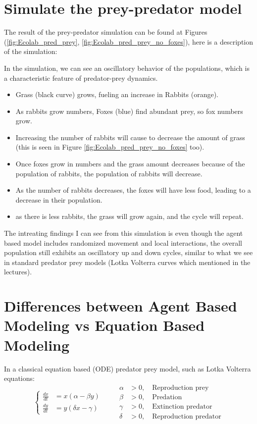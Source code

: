 \section{Simulate the prey-predator model}

The result of the prey-predator simulation can be found at Figures (\ref{fig:Ecolab_pred_prey}, \ref{fig:Ecolab_pred_prey_no_foxes}), here is a description of the simulation:

In the simulation, we can see an oscillatory behavior of the populations, which is a characteristic feature of predator-prey dynamics.
\begin{itemize}
    \item Grass (black curve) grows, fueling an increase in Rabbits (orange).
    \item As rabbits grow numbers, Foxes (blue) find abundant prey, so fox numbers grow.
    \item Increasing the number of rabbits will cause to decrease the amount of grass (this is seen in Figure \ref{fig:Ecolab_pred_prey_no_foxes} too).
    \item Once foxes grow in numbers and the grass amount decreases because of the population of rabbits, the population of rabbits will decrease.
    \item As the number of rabbits decreases, the foxes will have less food, leading to a decrease in their population.
    \item as there is less rabbits, the grass will grow again, and the cycle will repeat.
\end{itemize}

The intreating findings I can see from this simulation is even though the agent based model includes randomized movement and local interactions, the overall population still exhibits an oscillatory up and down cycles, similar to what we see in standard predator prey models (Lotka Volterra curves which mentioned in the lectures).


\section{Differences between Agent Based Modeling vs Equation Based Modeling}

In a classical equation based (ODE) predator prey model, such as Lotka Volterra equations:
\[
\left\{
\begin{aligned}
\frac{dx}{dt} &= x(\alpha - \beta y) \\
\frac{dy}{dt} &= y(\delta x - \gamma)
\end{aligned}
\right.
\qquad
\begin{aligned}
\alpha &> 0, \quad \text{Reproduction prey} \\
\beta &> 0, \quad \text{Predation} \\
\gamma &> 0, \quad \text{Extinction predator} \\
\delta &> 0, \quad \text{Reproduction predator}
\end{aligned}
\]

